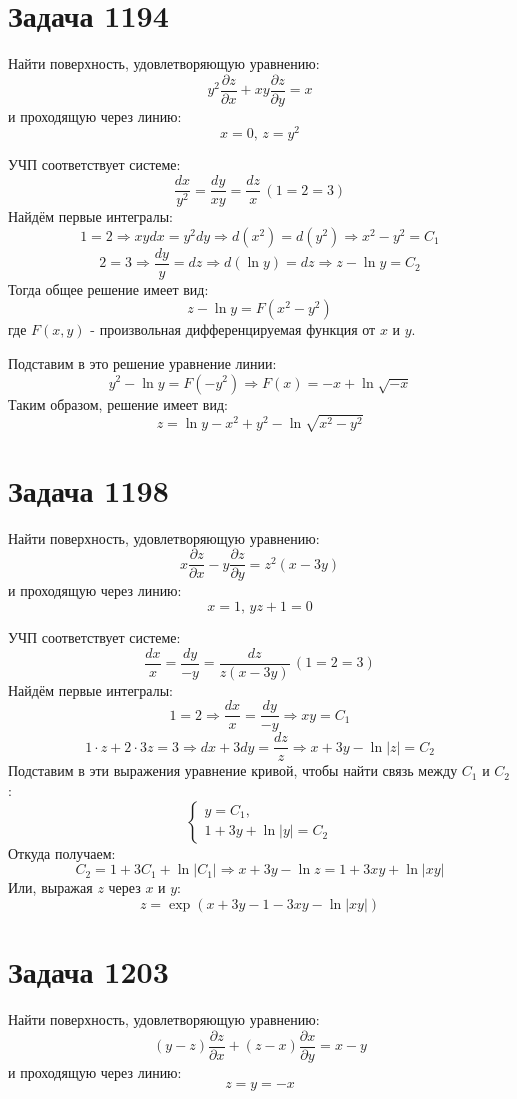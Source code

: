 \documentclass[11pt]{article}
\author{Sergey Makarov}
\date{\today}
\title{}
\begin{document}
\section{Задача 1194}
\label{sec:org1048846}
Найти поверхность, удовлетворяющую уравнению:
$$y^2\frac{\partial{z}}{\partial{x}} + xy\frac{\partial{z}}{\partial{y}} = x$$
и проходящую через линию:
$$x = 0,\, z = y^2$$

УЧП соответствует системе:
$$\frac{dx}{y^2} = \frac{dy}{xy} = \frac{dz}{x}\, (1 = 2 = 3)$$
Найдём первые интегралы:
$$1 = 2 \Rightarrow xydx = y^2dy \Rightarrow d(x^2) = d(y^2) \Rightarrow x^2 - y^2 = C_1$$
$$2 = 3 \Rightarrow \frac{dy}{y} = dz \Rightarrow d(\ln{y}) = dz \Rightarrow z - \ln{y} = C_2$$
Тогда общее решение имеет вид:
$$z - \ln{y} = F(x^2 - y^2)$$
где \(F(x, y)\) - произвольная дифференцируемая функция от \(x\) и \(y\).

Подставим в это решение уравнение линии:
$$y^2 - \ln{y} = F(-y^2) \Rightarrow F(x) = -x + \ln{\sqrt{-x}}$$
Таким образом, решение имеет вид:
$$z = \ln{y} - x^2 + y^2 - \ln{\sqrt{x^2 - y^2}}$$

\section{Задача 1198}
\label{sec:org34bcf8c}
Найти поверхность, удовлетворяющую уравнению:
$$x\frac{\partial{z}}{\partial{x}} - y\frac{\partial{z}}{\partial{y}} = z^2(x - 3y)$$
и проходящую через линию:
$$x = 1,\, yz + 1 = 0$$

УЧП соответствует системе:
$$\frac{dx}{x} = \frac{dy}{-y} = \frac{dz}{z(x - 3y)}\, (1 = 2 = 3)$$
Найдём первые интегралы:
$$1 = 2 \Rightarrow \frac{dx}{x} = \frac{dy}{-y} \Rightarrow xy = C_1$$
$$1 \cdot z + 2 \cdot 3z = 3 \Rightarrow dx + 3dy = \frac{dz}{z} \Rightarrow x + 3y - \ln{|z|} = C_2$$
Подставим в эти выражения уравнение кривой, чтобы найти связь между \(C_1\) и \(C_2\):
\begin{equation*}
  \begin{cases}
    y = C_1,\\
    1 + 3y + \ln{|y|} = C_2
  \end{cases}
\end{equation*}
Откуда получаем:
$$C_2 = 1 + 3C_1 + \ln{|C_1|} \Rightarrow x + 3y - \ln{z} = 1 + 3xy + \ln{|xy|}$$
Или, выражая \(z\) через \(x\) и \(y\):
$$z = \exp{(x + 3y - 1 - 3xy - \ln{|xy|})}$$

\section{Задача 1203}
\label{sec:org33ff3eb}
Найти поверхность, удовлетворяющую уравнению:
$$(y - z)\frac{\partial{z}}{\partial{x}} + (z - x)\frac{\partial{x}}{\partial{y}} = x - y$$
и проходящую через линию:
$$z = y = -x$$
\end{document}
